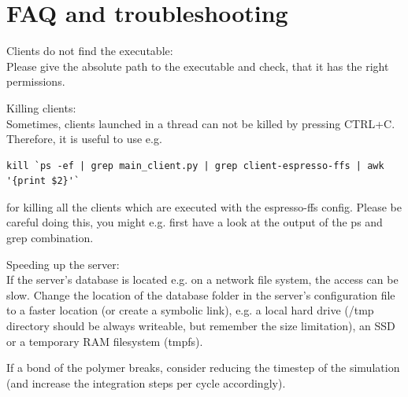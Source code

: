 \documentclass[a4paper,oneside]{article}
\newenvironment{mylisting}
{\begin{list}{}{\setlength{\leftmargin}{1em}}\item\scriptsize\bfseries}
{\end{list}}
\begin{document}
\section{FAQ and troubleshooting}
\begin{itemize}
 \item Clients do not find the executable:\\
  Please give the absolute path to the executable and check, that it has the right permissions.
 \item Killing clients:\\
Sometimes, clients launched in a thread can not be killed by pressing CTRL+C. Therefore, it is useful to use e.g.
\begin{mylisting}
\begin{verbatim}
kill `ps -ef | grep main_client.py | grep client-espresso-ffs | awk '{print $2}'`
\end{verbatim}
\end{mylisting}
for killing all the clients which are executed with the espresso-ffs config. Please be careful doing this, you might e.g. first have a look at the output of the ps and grep combination.
 \item Speeding up the server:\\
 If the server's database is located e.g. on a network file system, the access can be slow. Change the location of the database folder in the server's configuration file to a faster location (or create a symbolic link), e.g. a local hard drive (/tmp directory should be always writeable, but remember the size limitation), an SSD or a temporary RAM filesystem (tmpfs).
 \item If a bond of the polymer breaks, consider reducing the timestep of the simulation (and increase the integration steps per cycle accordingly).
\end{itemize}
\end{document}
